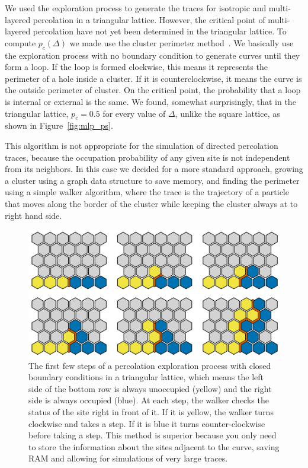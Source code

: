We used the exploration process to generate the traces for isotropic and
multi-layered percolation in a triangular lattice. However, the critical point
of multi-layered percolation have not yet been determined in the triangular
lattice. To compute $p_c(\Delta)$ we made use the cluster perimeter
method~\cite{Ziff1986}. We basically use the exploration process with no
boundary condition to generate curves until they form a loop. If the loop is
formed clockwise, this means it represents the perimeter of a hole inside a
cluster. If it is counterclockwise, it means the curve is the outside perimeter
of cluster. On the critical point, the probability that a loop is internal or
external is the same. We found, somewhat surprisingly, that in the triangular
lattice, $p_c=0.5$ for every value of $\Delta$, unlike the square lattice, as
shown in Figure~\ref{fig:mlp_ps}.

This algorithm is not appropriate for the simulation of directed percolation
traces, because the occupation probability of any given site is not independent
from its neighbors. In this case we decided for a more standard approach,
growing a cluster using a graph data structure to save memory, and finding the
perimeter using a simple walker algorithm, where the trace is the trajectory of
a particle that moves along the border of the cluster while keeping the cluster
always at to right hand side.

\begin{figure}
\begin{center}
    \includegraphics[scale=0.45]{chapters/ch6-asle/figs/explore}
\end{center}
\caption{The first few steps of a percolation exploration process with closed
    boundary conditions in a triangular lattice, which means the left side of
    the bottom row is always unoccupied (yellow) and the right side is always
    occupied (blue). At each step, the walker checks the status of the site
    right in front of it. If it is yellow, the walker turns clockwise and takes
    a step. If it is blue it turns counter-clockwise before taking a step. This
    method is superior because you only need to store the information about the
    sites adjacent to the curve, saving RAM and allowing for simulations of
    very large traces.}
\label{fig:explore}
\end{figure}

